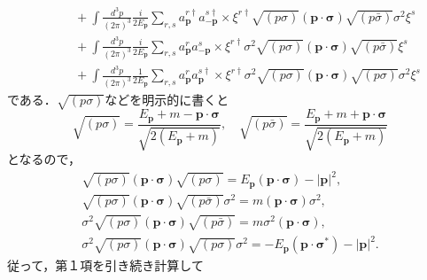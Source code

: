 \begin{align*}
  & \qquad + \int \frac{d^3p}{(2\pi)^3} \frac{i}{2E_{\boldsymbol{p}}}
  \sum_{r, s} a_{\boldsymbol{p}}^{r\dagger} a_{-\boldsymbol{p}}^{s\dagger}
  \times \xi^{r\dagger} \sqrt{(p \sigma)} (\boldsymbol{p} \cdot \boldsymbol{\sigma}) \sqrt{(p \bar\sigma)} \sigma^2 \xi^s \\
  & \qquad + \int \frac{d^3p}{(2\pi)^3} \frac{i}{2E_{\boldsymbol{p}}}
  \sum_{r, s} a_{\boldsymbol{p}}^{r} a_{-\boldsymbol{p}}^s
  \times \xi^{r\dagger} \sigma^2 \sqrt{(p \sigma)} (\boldsymbol{p} \cdot \boldsymbol{\sigma}) \sqrt{(p \bar\sigma)} \xi^s \\
  & \qquad + \int \frac{d^3p}{(2\pi)^3} \frac{1}{2E_{\boldsymbol{p}}}
  \sum_{r, s} a_{\boldsymbol{p}}^{r} a_{\boldsymbol{p}}^{s\dagger}
  \times \xi^{r\dagger} \sigma^2 \sqrt{(p \sigma)} (\boldsymbol{p} \cdot \boldsymbol{\sigma}) \sqrt{(p \sigma)} \sigma^2 \xi^s
\end{align*}
である．$\sqrt{(p\sigma)}$などを明示的に書くと
\[ \sqrt{(p \sigma)} = \frac{E_{\boldsymbol{p}} + m - \boldsymbol{p} \cdot \boldsymbol{\sigma}}{\sqrt{2 (E_{\boldsymbol{p}} + m)}} , \quad \sqrt{(p \bar\sigma)} = \frac{E_{\boldsymbol{p}} + m + \boldsymbol{p} \cdot \boldsymbol{\sigma}}{\sqrt{2 (E_{\boldsymbol{p}} + m)}} \]
となるので，
\begin{align*}
  \sqrt{(p \sigma)} (\boldsymbol{p} \cdot \boldsymbol{\sigma}) \sqrt{(p \sigma)} = E_{\boldsymbol{p}} (\boldsymbol{p} \cdot \boldsymbol{\sigma}) - \lvert \boldsymbol{p} \rvert^2 , \\
  \sqrt{(p \sigma)} (\boldsymbol{p} \cdot \boldsymbol{\sigma}) \sqrt{(p \bar\sigma)} \sigma^2 = m (\boldsymbol{p} \cdot \boldsymbol{\sigma}) \sigma^2 , \\
  \sigma^2 \sqrt{(p \sigma)} (\boldsymbol{p} \cdot \boldsymbol{\sigma}) \sqrt{(p \bar\sigma)} = m \sigma^2 (\boldsymbol{p} \cdot \boldsymbol{\sigma}) , \\
  \sigma^2 \sqrt{(p \sigma)} (\boldsymbol{p} \cdot \boldsymbol{\sigma}) \sqrt{(p \sigma)} \sigma^2 = - E_{\boldsymbol{p}} (\boldsymbol{p} \cdot \boldsymbol{\sigma}^\ast) - \lvert \boldsymbol{p} \rvert^2 .
\end{align*}
従って，第１項を引き続き計算して
